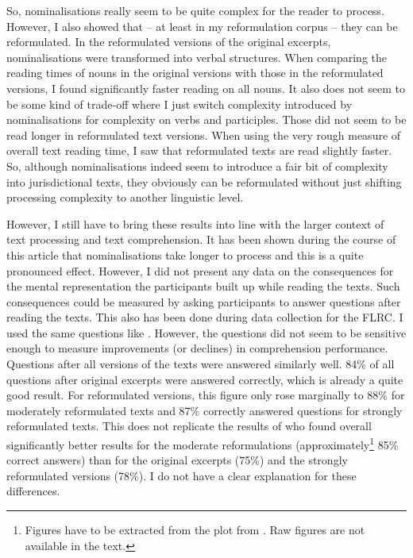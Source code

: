 \documentclass[output=paper]{langsci/langscibook}
\begin{document}
So, nominalisations really seem to be quite complex for the reader to process. However, I also showed that -- at least in my reformulation corpus -- they can be reformulated. In the reformulated versions of the original excerpts, nominalisations were transformed into verbal structures. When comparing the reading times of nouns in the original versions with those in the reformulated versions, I found significantly faster reading on all nouns. It also does not seem to be some kind of trade-off where I just switch complexity introduced by nominalisations for complexity on verbs and participles. Those did not seem to be read longer in reformulated text versions. When using the very rough measure of overall text reading time, I saw that reformulated texts are read slightly faster. So, although nominalisations indeed seem to introduce a fair bit of complexity into jurisdictional texts, they obviously can be reformulated without just shifting processing complexity to another linguistic level.

\largerpage
However, I still have to bring these results into line with the larger context of text processing and text comprehension. It has been shown during the course of this article that nominalisations take longer to process and this is a quite pronounced effect. However, I did not present any data on the consequences for the mental representation the participants built up while reading the texts. Such consequences could be measured by asking participants to answer questions after reading the texts. This also has been done during data collection for the FLRC. I used the same questions like \citet{Hansen2006}. However, the questions did not seem to be sensitive enough to measure improvements (or declines) in comprehension performance. Questions after all versions of the texts were answered similarly well. 84\% of all questions after original excerpts were answered correctly, which is already a quite good result. For reformulated versions, this figure only rose marginally to 88\% for moderately reformulated texts and 87\% correctly answered questions for strongly reformulated texts. This does not replicate the results of \citet{Hansen2006} who found overall significantly better results for the moderate reformulations (approximately\footnote{Figures have to be extracted from the plot from \citet[35]{Hansen2006}. Raw figures are not available in the text. } 85\% correct answers) than for the original excerpts (75\%) and the strongly reformulated versions (78\%). I do not have a clear explanation for these differences.
\end{document}
